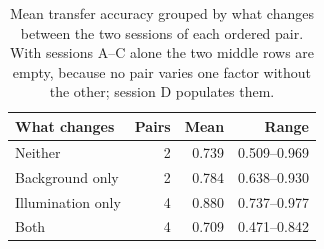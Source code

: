 \begin{table}[t]
\caption{Mean transfer accuracy grouped by what changes between the two sessions of each ordered pair. With sessions A--C alone the two middle rows are empty, because no pair varies one factor without the other; session D populates them.}
\label{tab:factors}
\centering
\footnotesize
\setlength{\tabcolsep}{4pt}
\renewcommand{\arraystretch}{1.02}
\begin{tabular}{@{}lrrr@{}}
\toprule
What changes & Pairs & Mean & Range \\
\midrule
Neither & 2 & 0.739 & 0.509--0.969 \\
Background only & 2 & 0.784 & 0.638--0.930 \\
Illumination only & 4 & 0.880 & 0.737--0.977 \\
Both & 4 & 0.709 & 0.471--0.842 \\
\bottomrule
\end{tabular}
\end{table}
